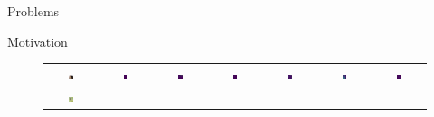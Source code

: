 \documentclass[aspectratio=169]{beamer}
\begin{document}
\begin{section}{Problems}
\begin{subsection}{Motivation}
\begin{frame}
\begin{figure}[h]
{\begin{tabular}{c cc cc cc }
      \\
      \includegraphics[width=0.10\textwidth]{resources/230914_1202_fig2_vizs_various_models/1500_orig.png} &
      \includegraphics[width=0.10\textwidth]{resources/230914_1202_fig2_vizs_various_models/deit3_base_patch16_224.fb_in22k_ft_in1k_1500_lastattmap.png} &
      \includegraphics[width=0.10\textwidth]{resources/230914_1202_fig2_vizs_various_models/deit3_large_patch16_224.fb_in22k_ft_in1k_1500_lastattmap.png} &
      \includegraphics[width=0.10\textwidth]{resources/230914_1202_fig2_vizs_various_models/vit_base_patch16_clip_224.laion2b_1500_lastattmap.png} &
      \includegraphics[width=0.10\textwidth]{resources/230914_1202_fig2_vizs_various_models/vit_large_patch14_clip_224.laion2b_1500_lastattmap.png} &
      \includegraphics[width=0.10\textwidth]{resources/230914_1202_fig2_vizs_various_models/vit_base_patch16_224.dino_1500_lastattmap.png} &
      \includegraphics[width=0.10\textwidth]{resources/230914_1202_fig2_vizs_various_models/vit_giant_patch14_dinov2.lvd142m_1500_lastattmap.png}
      \\
      \includegraphics[width=0.10\textwidth]{resources/230914_1202_fig2_vizs_various_models/85_orig.png} &

\end{tabular}}
\end{figure}
\end{frame}
\end{subsection}
\end{section}
\end{document}
